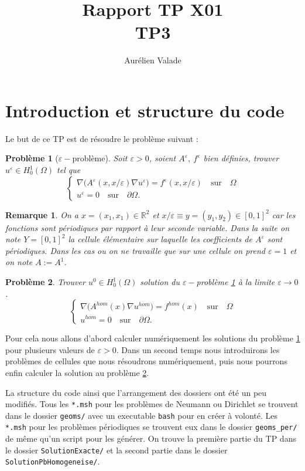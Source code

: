 \documentclass[11pt]{article}
\title{Rapport TP X01 \\ TP3}
\author{Aurélien Valade}
\date{}
\newtheorem{pb}{Problème}
\newtheorem{rmq}{Remarque}
\newcommand{\R}{\mathbb{R}}
\newcommand{\Ah}{A^{hom}}
\newcommand{\uh}{u^{hom}}
\newcommand{\fh}{f^{hom}}
\begin{document}
\maketitle

\section{Introduction et structure du code}


Le but de ce TP est de résoudre le problème suivant :

\begin{pb}[$\varepsilon-$problème]
  \label{pb:eps}
  Soit $\varepsilon>0$, soient $A^\varepsilon, ~f^\varepsilon$ bien définies, trouver $u^\varepsilon\in H^1_0(\Omega)$ tel que  
  \[
    \begin{cases}
      \nabla \big(A^\varepsilon(x,x/\varepsilon) \nabla u^\varepsilon\big) = f^\varepsilon(x, x/\varepsilon) \quad \mbox{sur}\quad \Omega\\
      u^\varepsilon = 0 \quad \mbox{sur}\quad \partial\Omega.
    \end{cases}
  \]
\end{pb}
\begin{rmq}
  On a $x =(x_1, x_1) \in \R^2$ et $x/\varepsilon \equiv y = (y_1, y_2) \in [0,1]^2$ car les fonctions sont périodiques par rapport à leur seconde
  variable. Dans la suite on note $Y=[0,1]^2$ la cellule élémentaire sur laquelle les coefficients de $A^\varepsilon$ sont périodiques. Dans les cas ou on
  ne travaille que sur une cellule on prend $\varepsilon=1$ et on note $A := A^1$.
\end{rmq}
\begin{pb}
  \label{pb:hom}
  Trouver $u^0 \in H^1_0(\Omega)$ solution du $\varepsilon-$problème \ref{pb:eps} à la limite $\varepsilon\to 0 $.
  \[
    \begin{cases}
      \nabla \big(\Ah(x) \nabla \uh\big) = \fh(x) \quad \mbox{sur}\quad \Omega\\
      \uh= 0 \quad \mbox{sur}\quad \partial\Omega.
    \end{cases}
  \]
\end{pb}


Pour cela nous allons d'abord calculer numériquement les solutions du problème \ref{pb:eps} pour plusieurs valeurs de $\varepsilon>0$. Dans un second temps nous
introduirons les problèmes de cellules que nous résoudrons numériquement, puis nous pourrons enfin calculer la solution au problème \ref{pb:hom}.

La structure du code ainsi que l'arrangement des dossiers ont été un peu modifiés. Tous les \texttt{*.msh} pour les problèmes de Neumann ou Dirichlet
se trouvent dans le dossier \texttt{geoms/} avec un executable \texttt{bash} pour en créer à volonté. Les \texttt{*.msh} pour les problèmes
périodiques se trouvent eux dans le dossier \texttt{geoms\_per/} de même qu'un script pour les générer. On trouve la première partie du TP dans le
dossier \texttt{SolutionExacte/} et la second partie dans le dossier \texttt{SolutionPbHomogeneise/}. 
\end{document}
